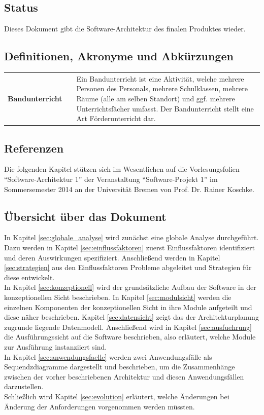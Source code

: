 \documentclass[fontsize=12pt,paper=a4,twoside]{scrartcl}
\renewcommand{\arraystretch}{1.2}
\begin{document}
\subsection{Status}
Dieses Dokument gibt die Software-Architektur des finalen Produktes wieder.


  
\subsection{Definitionen, Akronyme und Abkürzungen}
\label{subsec:definitionen}
\renewcommand{\arraystretch}{2}
\begin{tabularx}{\textwidth}{Xp{1cm}p{9.5cm}}
\textbf{Bandunterricht} 	&  	& 	Ein Bandunterricht ist eine Aktivität, welche mehrere Personen des Personals, mehrere Schulklassen, mehrere Räume (alle am selben Standort) und ggf. mehrere Unterrichtsfächer umfasst. Der Bandunterricht stellt eine Art Förderunterricht dar. \\ 
\end{tabularx} 
\renewcommand{\arraystretch}{1.4}

\subsection{Referenzen}
Die folgenden Kapitel stützen sich im Wesentlichen auf die Vorlesungsfolien "`Software-Architektur 1"' der Veranstaltung "`Software-Projekt 1"' im Sommersemester 2014 an der Universität Bremen von Prof. Dr. Rainer Koschke.


\subsection{Übersicht über das Dokument}
In Kapitel \ref{sec:globale_analyse} wird zunächst eine globale Analyse durchgeführt. Dazu werden in Kapitel \ref{sec:einflussfaktoren} zuerst Einflussfaktoren identifiziert und deren Auswirkungen spezifiziert. Anschließend werden in Kapitel \ref{sec:strategien} aus den Einflussfaktoren Probleme abgeleitet und Strategien für diese entwickelt. \\
In Kapitel \ref{sec:konzeptionell} wird der grundsätzliche Aufbau der Software in der konzeptionellen Sicht beschrieben. In Kapitel \ref{sec:modulsicht} werden die einzelnen Komponenten der konzeptionellen Sicht in ihre Module aufgeteilt und diese näher beschrieben. Kapitel \ref{sec:datensicht} zeigt das der Architekturplanung zugrunde liegende Datenmodell. Anschließend wird in Kapitel \ref{sec:ausfuehrung} die Ausführungssicht auf die Software beschrieben, also erläutert, welche Module zur Ausführung instanziiert sind. 
\\
In Kapitel \ref{sec:anwendungsfaelle} werden zwei Anwendungsfälle als Sequendzdiagramme dargestellt und beschrieben, um die Zusammenhänge zwischen der vorher beschriebenen Architektur und diesen Anwendungsfällen darzustellen.\\
Schließlich wird Kapitel \ref{sec:evolution} erläutert, welche Änderungen bei Änderung der Anforderungen vorgenommen werden müssten.
\end{document}
